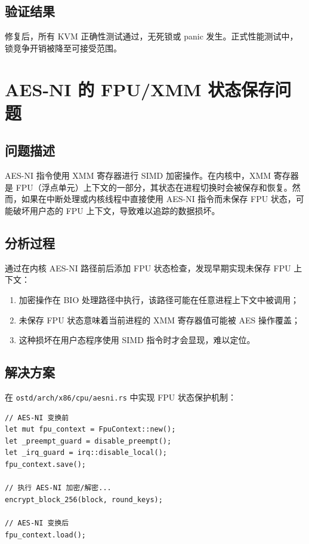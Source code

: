 \subsection{验证结果}

修复后，所有 KVM 正确性测试通过，无死锁或 panic 发生。正式性能测试中，锁竞争开销被降至可接受范围。

\section{AES-NI 的 FPU/XMM 状态保存问题}

\subsection{问题描述}

AES-NI 指令使用 XMM 寄存器进行 SIMD 加密操作。在内核中，XMM 寄存器是 FPU（浮点单元）上下文的一部分，其状态在进程切换时会被保存和恢复。然而，如果在中断处理或内核线程中直接使用 AES-NI 指令而未保存 FPU 状态，可能破坏用户态的 FPU 上下文，导致难以追踪的数据损坏。

\subsection{分析过程}

通过在内核 AES-NI 路径前后添加 FPU 状态检查，发现早期实现未保存 FPU 上下文：
\begin{enumerate}
    \item 加密操作在 BIO 处理路径中执行，该路径可能在任意进程上下文中被调用；
    \item 未保存 FPU 状态意味着当前进程的 XMM 寄存器值可能被 AES 操作覆盖；
    \item 这种损坏在用户态程序使用 SIMD 指令时才会显现，难以定位。
\end{enumerate}

\subsection{解决方案}

在 \texttt{ostd/arch/x86/cpu/aesni.rs} 中实现 FPU 状态保护机制：

\begin{verbatim}
// AES-NI 变换前
let mut fpu_context = FpuContext::new();
let _preempt_guard = disable_preempt();
let _irq_guard = irq::disable_local();
fpu_context.save();

// 执行 AES-NI 加密/解密...
encrypt_block_256(block, round_keys);

// AES-NI 变换后
fpu_context.load();
\end{verbatim}


